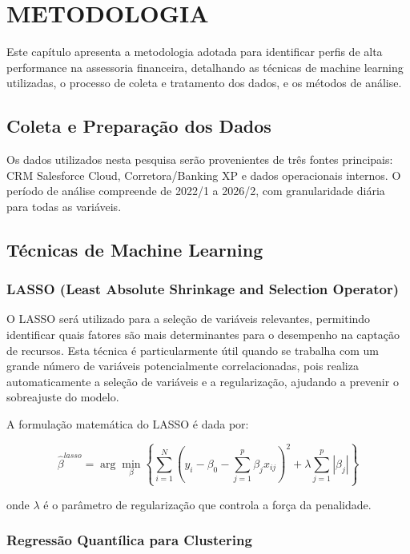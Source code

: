 \chapter{METODOLOGIA}

Este capítulo apresenta a metodologia adotada para identificar perfis de alta performance na assessoria financeira, detalhando as técnicas de machine learning utilizadas, o processo de coleta e tratamento dos dados, e os métodos de análise.

\section{Coleta e Preparação dos Dados}

Os dados utilizados nesta pesquisa serão provenientes de três fontes principais: CRM Salesforce Cloud, Corretora/Banking XP e dados operacionais internos. O período de análise compreende de 2022/1 a 2026/2, com granularidade diária para todas as variáveis.

\section{Técnicas de Machine Learning}

\subsection{LASSO (Least Absolute Shrinkage and Selection Operator)}

O LASSO será utilizado para a seleção de variáveis relevantes, permitindo identificar quais fatores são mais determinantes para o desempenho na captação de recursos. Esta técnica é particularmente útil quando se trabalha com um grande número de variáveis potencialmente correlacionadas, pois realiza automaticamente a seleção de variáveis e a regularização, ajudando a prevenir o sobreajuste do modelo.

A formulação matemática do LASSO é dada por:

\begin{equation}
\hat{\beta}^{lasso} = \arg\min_{\beta} \left\{ \sum_{i=1}^{N} (y_i - \beta_0 - \sum_{j=1}^{p} \beta_j x_{ij})^2 + \lambda \sum_{j=1}^{p} |\beta_j| \right\}
\end{equation}

onde $\lambda$ é o parâmetro de regularização que controla a força da penalidade.

\subsection{Regressão Quantílica para Clustering}

